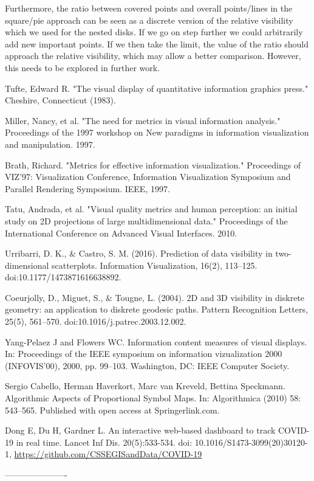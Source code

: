 \documentclass[a4paper,11pt]{article}
\begin{document}
Furthermore, the ratio between covered points and overall points/lines in the square/pie approach can be seen as a discrete version of the relative visibility which we used for the nested disks. If we go on step further we could arbitrarily add new important points. If we then take the limit, the value of the ratio should approach the relative visibility, which may allow a better comparison. However, this needs to be explored in further work.

\begin{thebibliography}{999}

  Tufte, Edward R. "The visual display of quantitative information graphics press." Cheshire, Connecticut (1983).

  Miller, Nancy, et al. "The need for metrics in visual information analysis." Proceedings of the 1997 workshop on New paradigms in information visualization and manipulation. 1997.

  Brath, Richard. "Metrics for effective information visualization." Proceedings of VIZ'97: Visualization Conference, Information Visualization Symposium and Parallel Rendering Symposium. IEEE, 1997.

  Tatu, Andrada, et al. "Visual quality metrics and human perception: an initial study on 2D projections of large multidimensional data." Proceedings of the International Conference on Advanced Visual Interfaces. 2010.

  Urribarri, D. K., \& Castro, S. M. (2016). Prediction of data visibility in two-dimensional scatterplots. Information Visualization, 16(2), 113–125. doi:10.1177/1473871616638892.

  Coeurjolly, D., Miguet, S., \& Tougne, L. (2004). 2D and 3D visibility in diskrete geometry: an application to diskrete geodesic paths. Pattern Recognition Letters, 25(5), 561–570. doi:10.1016/j.patrec.2003.12.002.

  Yang-Pelaez J and Flowers WC. Information content
  measures of visual displays. In: Proceedings of the IEEE symposium on information vizualization 2000 (INFOVIS’00), 2000, pp. 99–103. Washington, DC: IEEE Computer Society.

  Sergio Cabello, Herman Haverkort, Marc van Kreveld, Bettina Speckmann. Algorithmic Aspects of Proportional Symbol Maps. In: Algorithmica (2010) 58: 543–565. Published with open access at Springerlink.com.%

   Dong E, Du H, Gardner L. An interactive web-based dashboard to track COVID-19 in real time. Lancet Inf Dis. 20(5):533-534. doi: 10.1016/S1473-3099(20)30120-1, \url{https://github.com/CSSEGISandData/COVID-19}



\end{thebibliography}

----------------------
\end{document}
